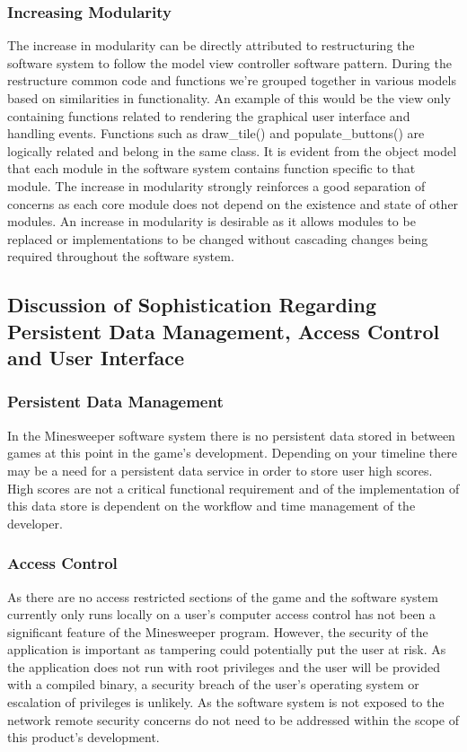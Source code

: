 \documentclass[12pt, a4]{report}
\begin{document}
\subsubsection{Increasing Modularity}
The increase in modularity can be directly attributed to restructuring the software system to follow the model view controller software pattern. During the restructure common code and functions we're grouped together in various models based on similarities in functionality. An example of this would be the view only containing functions related to rendering the graphical user interface and handling events. Functions such as draw\_tile() and populate\_buttons() are logically related and belong in the same class. It is evident from the object model that each module in the software system contains function specific to that module. The increase in modularity strongly reinforces a good separation of concerns as each core module does not depend on the existence and state of other modules. An increase in modularity is desirable as it allows modules to be replaced or implementations to be changed without cascading changes being required throughout the software system.

\subsection{Discussion of Sophistication Regarding Persistent Data Management, Access Control and User Interface}
\subsubsection{Persistent Data Management}
In the Minesweeper software system there is no persistent data stored in between games at this point in the game's development. Depending on your timeline there may be a need for a persistent data service in order to store user high scores. High scores are not a critical functional requirement and of the implementation of this data store is dependent on the workflow and time management of the developer.

\subsubsection{Access Control}
As there are no access restricted sections of the game and the software system currently only runs locally on a user's computer access control has not been a significant feature of the Minesweeper program. However, the security of the application is important as tampering could potentially put the user at risk. As the application does not run with root privileges and the user will be provided with a compiled binary, a security breach of the user's operating system or escalation of privileges is unlikely. As the software system is not exposed to the network remote security concerns do not need to be addressed within the scope of this product's development.
\end{document}
